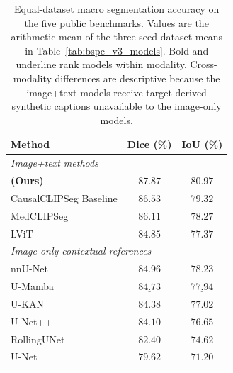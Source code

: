 \ifnum{}
\begin{table}[t]
\centering
\caption{Equal-dataset macro segmentation accuracy on the five public
benchmarks. Values are the arithmetic mean of the three-seed dataset means in
Table~\ref{tab:bspc_v3_models}. Bold and underline rank
models within modality. Cross-modality differences are descriptive because the
image+text models receive target-derived synthetic captions unavailable to the
image-only models.}
\label{tab:public5_macro_accuracy}
\small
\setlength{\tabcolsep}{6pt}
\begin{tabular}{lcc}
\toprule
Method & Dice (\%) & IoU (\%) \\
\midrule
\multicolumn{3}{l}{\textit{Image+text methods}} \\
\textbf{\methodname{} (Ours)} & $\mathbf{87.87}$ & $\mathbf{80.97}$ \\
CausalCLIPSeg Baseline & $\underline{86.53}$ & $\underline{79.32}$ \\
MedCLIPSeg & $86.11$ & $78.27$ \\
LViT & $84.85$ & $77.37$ \\
\midrule
\multicolumn{3}{l}{\textit{Image-only contextual references}} \\
nnU-Net & $\mathbf{84.96}$ & $\mathbf{78.23}$ \\
U-Mamba & $\underline{84.73}$ & $\underline{77.94}$ \\
U-KAN & $84.38$ & $77.02$ \\
U-Net++ & $84.10$ & $76.65$ \\
RollingUNet & $82.40$ & $74.62$ \\
U-Net & $79.62$ & $71.20$ \\
\bottomrule
\end{tabular}
\end{table}
\fi

